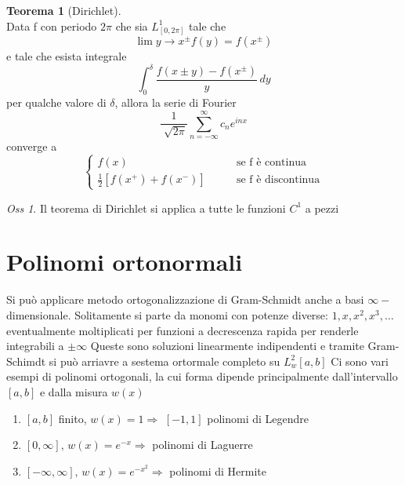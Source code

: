 \documentclass[a4paper,11pt]{report}
\theoremstyle{remark}
\newtheorem*{oss}{Oss}
\theoremstyle{definition}
\newtheorem*{teo}{Teorema}
\begin{document}
\begin{teo}[Dirichlet]\hfill\\
	Data f con periodo $2\pi$  che sia $L^1_{[0,2\pi]}$ tale che 
	\begin{equation*}
		\lim{y\to x^{\pm}} f(y) = f(x^{\pm})	
	\end{equation*}
	e tale che esista integrale 
	\begin{equation*}
		\int_0^\delta \frac{f(x\pm y)-f(x^{\pm})}{y} \, dy
	\end{equation*}	
	per qualche valore di $\delta$, allora la serie di Fourier 
	\begin{equation*}
		\frac{1}{\sqrt[]{2\pi}} \sum_{n=-\infty}^\infty c_n e^{inx}
	\end{equation*}
	converge a 
	\begin{equation*}
		\begin{cases}
			f(x) \qquad &\text{se f è continua}\\
			\frac{1}{2}[f(x^+)+f(x^-)] \qquad & \text{se f è discontinua}
		\end{cases}
	\end{equation*}
\end{teo}

\begin{oss}
	Il teorema di Dirichlet si applica a tutte le funzioni $C^1$ a pezzi 
\end{oss}

\chapter{Polinomi ortonormali}

Si può applicare metodo ortogonalizzazione di Gram-Schmidt anche a basi $\infty-$dimensionale. \newline
Solitamente si parte da monomi con potenze diverse: $1,x,x^2,x^3,\dots$ eventualmente moltiplicati per funzioni a decrescenza rapida per renderle integrabili a $\pm\infty$ \newline
Queste sono soluzioni linearmente indipendenti e tramite Gram-Schimdt si può arriavre a sestema ortormale completo su $L^2_w [a,b]$ \newline
Ci sono vari esempi di polinomi ortogonali, la cui forma dipende principalmente dall'intervallo $[a,b]$ e dalla misura $w(x)$
\begin{enumerate}
	\item $[a,b]$ finito, $w(x)=1 \Rightarrow$ $[-1,1]$ polinomi di Legendre
 \item $[0,\infty], \, w(x)=e^{-x} \Rightarrow$ polinomi di Laguerre
 \item $[-\infty,\infty], \, w(x) = e^{-x^2} \Rightarrow$ polinomi di Hermite
\end{enumerate}
\end{document}
